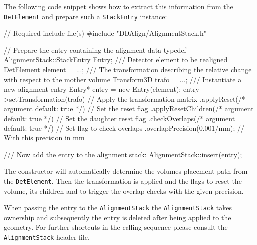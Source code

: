 \documentclass[10pt,a4paper]{article}
\begin{document}
\noindent
The following code snippet shows how to extract this information from the
{\tt DetElement} and prepare such a {\tt StackEntry} instance:
\begin{code}
// Required include file(s)
#include "DDAlign/AlignmentStack.h"

    // Prepare the entry containing the alignment data
    typedef AlignmentStack::StackEntry Entry;
    /// Detector element to be realigned
    DetElement element = ...;
    /// The transformation describing the relative change with respect to the mother volume
    Transform3D trafo = ...;
    /// Instantiate a new alignment entry
    Entry* entry = new Entry(element);
    entry->setTransformation(trafo)                         // Apply the transformation matrix
        .applyReset(/* argument default: true */)           // Set the reset flag
        .applyResetChildren(/* argument default: true */)   // Set the daughter reset flag
        .checkOverlaps(/* argument default: true */)        // Set flag to check overlaps
        .overlapPrecision(0.001/mm);                        // With this precision in mm

    /// Now add the entry to the alignment stack:
    AlignmentStack::insert(entry);
\end{code}
The constructor will automatically determine the volumes placement path
from the {\tt DetElement}. Then the transformation is applied and the flags
to reset the volume, its children and to trigger the overlap checks with 
the given precision.

\noindent
When passing the entry to the {\tt AlignmentStack} the {\tt AlignmentStack}
takes ownership and subsequently the entry is deleted after being applied to
the geometry. For further shortcuts in the calling sequence please consult the
{\tt AlignmentStack} header file.
\end{document}
